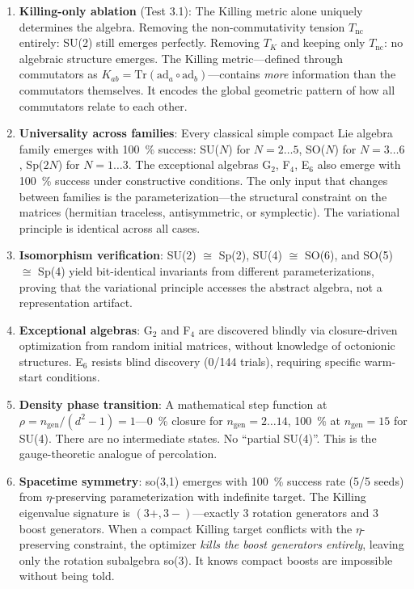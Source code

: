 \begin{enumerate}[label=\arabic*.]
\item \textbf{Killing-only ablation} (Test 3.1): The Killing metric alone uniquely determines the algebra. Removing the non-commutativity tension $T_{\mathrm{nc}}$ entirely: SU(2) still emerges perfectly. Removing $T_K$ and keeping only $T_{\mathrm{nc}}$: no algebraic structure emerges. The Killing metric---defined through commutators as $K_{ab} = \mathrm{Tr}(\mathrm{ad}_a \circ \mathrm{ad}_b)$---contains \textit{more} information than the commutators themselves. It encodes the global geometric pattern of how all commutators relate to each other.

\item \textbf{Universality across families}: Every classical simple compact Lie algebra family emerges with \SI{100}{\percent} success: SU($N$) for $N=2\ldots 5$, SO($N$) for $N=3\ldots 6$, Sp($2N$) for $N=1\ldots 3$. The exceptional algebras G$_2$, F$_4$, E$_6$ also emerge with \SI{100}{\percent} success under constructive conditions. The only input that changes between families is the parameterization---the structural constraint on the matrices (hermitian traceless, antisymmetric, or symplectic). The variational principle is identical across all cases.

\item \textbf{Isomorphism verification}: SU(2) $\cong$ Sp(2), SU(4) $\cong$ SO(6), and SO(5) $\cong$ Sp(4) yield bit-identical invariants from different parameterizations, proving that the variational principle accesses the abstract algebra, not a representation artifact.

\item \textbf{Exceptional algebras}: G$_2$ and F$_4$ are discovered blindly via closure-driven optimization from random initial matrices, without knowledge of octonionic structures. E$_6$ resists blind discovery (0/144 trials), requiring specific warm-start conditions.

\item \textbf{Density phase transition}: A mathematical step function at $\rho = n_{\mathrm{gen}}/(d^2-1) = 1$---\SI{0}{\percent} closure for $n_{\mathrm{gen}} = 2\ldots 14$, \SI{100}{\percent} at $n_{\mathrm{gen}} = 15$ for SU(4). There are no intermediate states. No ``partial SU(4)''. This is the gauge-theoretic analogue of percolation.

\item \textbf{Spacetime symmetry}: so(3,1) emerges with \SI{100}{\percent} success rate (5/5 seeds) from $\eta$-preserving parameterization with indefinite target. The Killing eigenvalue signature is $(3+,3-)$---exactly 3 rotation generators and 3 boost generators. When a compact Killing target conflicts with the $\eta$-preserving constraint, the optimizer \textit{kills the boost generators entirely}, leaving only the rotation subalgebra so(3). It knows compact boosts are impossible without being told.


\end{enumerate}
